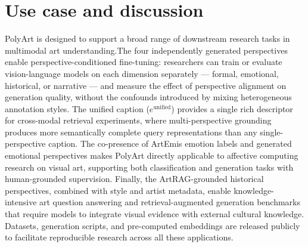 \section{Use case and discussion}
PolyArt is designed to support a broad range of downstream research tasks in multimodal art understanding.The four independently generated perspectives enable perspective-conditioned fine-tuning: researchers can train or evaluate vision-language models on each dimension separately --- formal, emotional, historical, or narrative --- and measure the effect of perspective alignment on generation quality, without the confounds introduced by mixing heterogeneous annotation styles.
The unified caption ($e^{\text{unified}}$) provides a single rich descriptor for cross-modal retrieval experiments, where multi-perspective grounding produces more semantically complete query representations than any single-perspective caption.
The co-presence of ArtEmis emotion labels and generated emotional perspectives makes PolyArt directly applicable to affective computing research on visual art, supporting both classification and generation tasks with human-grounded supervision.
Finally, the ArtRAG-grounded historical perspectives, combined with style and artist metadata, enable knowledge-intensive art question answering and retrieval-augmented generation benchmarks that require models to integrate visual evidence with external cultural knowledge.
Datasets, generation scripts, and pre-computed embeddings are released publicly to facilitate reproducible research across all these applications.

